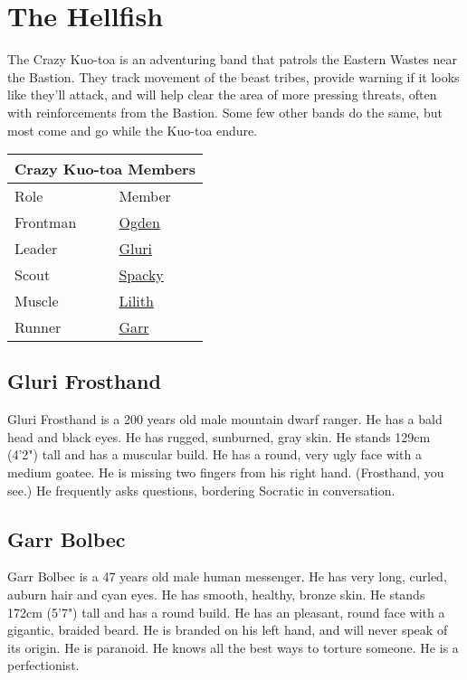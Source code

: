 \section{The Hellfish}

The Crazy Kuo-toa is an adventuring band that patrols the Eastern Wastes near the Bastion.
They track movement of the beast tribes, provide warning if it looks like they'll attack, and will
  help clear the area of more pressing threats, often with reinforcements from the Bastion.
Some few other bands do the same, but most come and go while the Kuo-toa endure.

\bigskip
\begin{center}
\begin{tabular}{|l|l|}
\hline
\multicolumn{2}{|c|}{Crazy Kuo-toa Members}\\
\hline
Role & Member \\
\hline
Frontman & \hyperref[subsec:ogden]{Ogden} \\
Leader & \hyperref[subsec:gluri]{Gluri} \\
Scout & \hyperref[subsec:buddyhawks]{Spacky} \\
Muscle & \hyperref[subsec:alotel]{Lilith} \\
Runner & \hyperref[subsec:garr]{Garr} \\
\hline
\end{tabular}
\end{center}

\subsection{Gluri Frosthand}\label{subsec:gluri}

Gluri Frosthand is a 200 years old male mountain dwarf ranger.
He has a bald head and black eyes.
He has rugged, sunburned, gray skin.
He stands 129cm (4'2") tall and has a muscular build.
He has a round, very ugly face with a medium goatee.
He is missing two fingers from his right hand.
(Frosthand, you see.)
He frequently asks questions, bordering Socratic in conversation.

\subsection{Garr Bolbec}\label{subsec:garr}

Garr Bolbec is a 47 years old male human messenger.
He has very long, curled, auburn hair and cyan eyes.
He has smooth, healthy, bronze skin.
He stands 172cm (5'7") tall and has a round build.
He has an pleasant, round face with a gigantic, braided beard.
He is branded on his left hand, and will never speak of its origin.
He is paranoid.
He knows all the best ways to torture someone.
He is a perfectionist.

